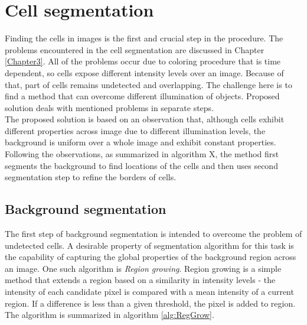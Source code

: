 
\chapter{Cell segmentation} %

\label{Chapter4} %



Finding the cells in images is the first and crucial step in the procedure. The problems encountered in the cell segmentation are discussed in Chapter \ref{Chapter3}. All of the problems occur due to coloring procedure that is time dependent, so cells expose different intensity levels over an image. Because of that, part of cells remains undetected and overlapping. The challenge here is to find a method that can overcome different illumination of objects. Proposed solution deals with mentioned problems in separate steps. \\


The proposed solution is based on an observation that, although cells exhibit different properties across image due to different illumination levels, the background is uniform over a whole image and exhibit constant properties. Following the observations, as summarized in algorithm X, the method first segments the background to find locations of the cells and then uses second segmentation step to refine the borders of cells. \\





\section{Background segmentation}

The first step of background segmentation is intended to overcome the problem of undetected cells. A desirable property of segmentation algorithm for this task is the capability of capturing the global properties of the background region across an image. One such algorithm is \textit{Region growing}. Region growing is a simple method that extends a region based on a similarity in intensity levels - the intensity of each candidate pixel is compared with a mean intensity of a current region. If a difference is less than a given threshold, the pixel is added to region. The algorithm is summarized in algorithm \ref{alg:RegGrow}. \\

